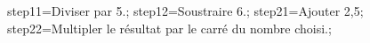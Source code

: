 \documentclass[exercice]{thedocument}%
\begin{document}
%
\>step11=Diviser par 5.;%
\>step12=Soustraire 6.;%
\>step21=Ajouter 2,5;%
\>step22=Multipler le résultat par le carré du nombre choisi.;%
%
\end{document}
